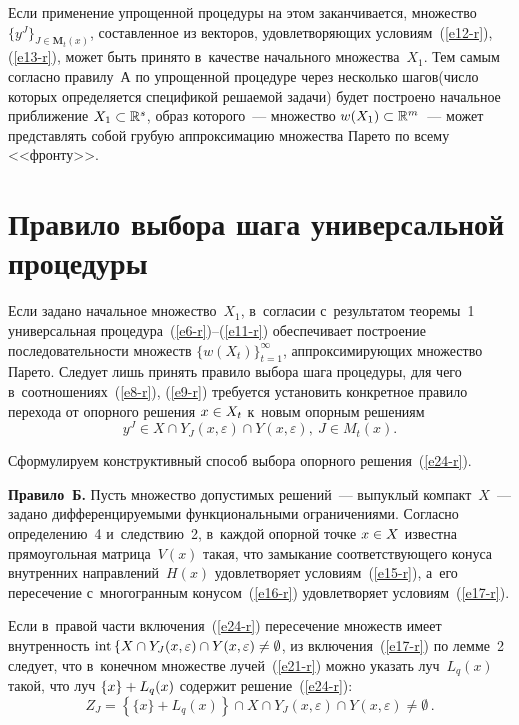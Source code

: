 \begin{multicols}{2}
  Если применение упрощенной процедуры на этом заканчивается, 
множество $\{ y^J\}_{J\in \mathbf{M}_t(x)}$, составленное из векторов, 
удовлетворяющих условиям~(\ref{e12-r}), (\ref{e13-r}), может быть принято в~качестве начального множества~$X_1$. Тем самым согласно правилу~А по 
упрощенной процедуре через несколько шагов\linebreak (число которых определяется 
спецификой ре\-ша\-емой задачи) будет построено начальное приближение 
$X_1\hm\subset \mathbb{R}^s$, образ которого~--- множество 
$w(X_1)\hm\subset \mathbb{R}^m$~--- может представлять собой грубую 
\mbox{аппроксимацию} множества Парето по всему <<фронту>>.

\vspace*{-6pt}

  
\section{Правило выбора шага универсальной процедуры}

\vspace*{-3pt}


  Если задано начальное множество~$X_1$, в~согласии с~результатом 
теоремы~1 универсальная процедура~(\ref{e6-r})--(\ref{e11-r}) обеспечивает 
построение последовательности множеств $\{ w(X_t)\}^\infty_{t=1}$, 
аппроксимирующих множество Парето. Следует лишь принять правило 
выбора шага процедуры, для чего в~соотношениях~(\ref{e8-r}), (\ref{e9-r}) 
требуется установить конкретное правило перехода от опорного решения 
$x\hm\in X_t$ к~новым опорным решениям
  \begin{equation}
  y^J\in X\cap Y_J(x,\varepsilon) \cap Y(x,\varepsilon),\ J\in M_t(x).
  \label{e24-r}
  \end{equation}
  
  Сформулируем конструктивный способ выбора опорного 
решения~(\ref{e24-r}).
  
  \smallskip
  
  \noindent
  \textbf{Правило~Б.} Пусть множество допустимых решений~--- выпуклый 
компакт~$X$~--- задано дифференцируемыми функциональными 
ограничениями. Согласно определению~4 и~следствию~2, в~каждой опорной 
точке $x\hm\in X$ известна прямоугольная мат\-ри\-ца~$V(x)$ такая, что 
замыкание со\-от\-вет\-ст\-ву\-юще\-го конуса внутренних на\-прав\-ле\-ний~$H(x)$ 
удовлетворяет условиям~(\ref{e15-r}), а~его пересечение с~многогранным 
конусом~(\ref{e16-r}) удовле\-тво\-ря\-ет условиям~(\ref{e17-r}).
  
  Если в~правой части включения~(\ref{e24-r}) пересечение множеств имеет 
внутренность $\mathrm{int}\, \{ X\hm\cap Y_J(x,\varepsilon) \hm\cap Y(x,\varepsilon)\not= 
\emptyset$, из включения~(\ref{e17-r}) по лемме~2 следует, что в~конечном 
множестве лучей~(\ref{e21-r}) можно указать луч~$L_q(x)$ такой, что луч 
$\{x\}\hm+ L_q(x)$ содержит решение~(\ref{e24-r}):
  \begin{equation}
  \!Z_J\!=\! \left\{ \{x\} +L_q(x)\right\}\cap X\cap Y_J(x,\varepsilon) \cap 
Y(x,\varepsilon) \not= \emptyset\,.
  \label{e25-r}
  \end{equation}
  

\end{multicols}
